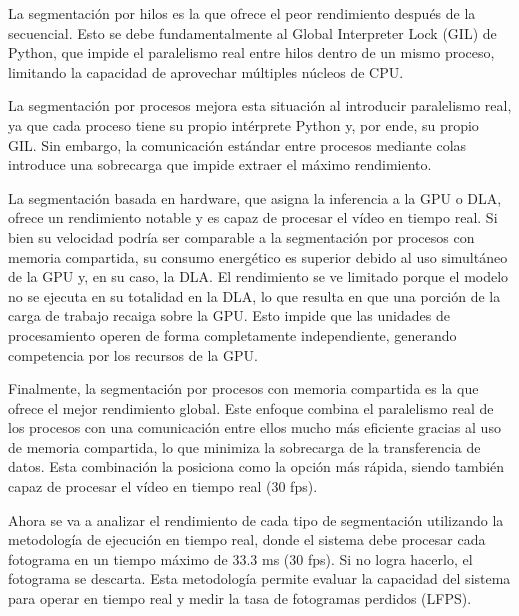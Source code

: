 \documentclass[11pt,spanish,listoffigures,listoftables]{tfgetsinf}
\begin{document}
La segmentación por hilos es la que ofrece el peor rendimiento después de la secuencial. Esto se debe fundamentalmente al Global Interpreter Lock (GIL) de Python, que impide el paralelismo real entre hilos dentro de un mismo proceso, limitando la capacidad de aprovechar múltiples núcleos de CPU.

La segmentación por procesos mejora esta situación al introducir paralelismo real, ya que cada proceso tiene su propio intérprete Python y, por ende, su propio GIL. Sin embargo, la comunicación estándar entre procesos mediante colas introduce una sobrecarga que impide extraer el máximo rendimiento.

La segmentación basada en hardware, que asigna la inferencia a la GPU o DLA, ofrece un rendimiento notable y es capaz de procesar el vídeo en tiempo real. Si bien su velocidad podría ser comparable a la segmentación por procesos con memoria compartida, su consumo energético es superior debido al uso simultáneo de la GPU y, en su caso, la DLA. El rendimiento se ve limitado porque el modelo no se ejecuta en su totalidad en la DLA, lo que resulta en que una porción de la carga de trabajo recaiga sobre la GPU. Esto impide que las unidades de procesamiento operen de forma completamente independiente, generando competencia por los recursos de la GPU.

Finalmente, la segmentación por procesos con memoria compartida es la que ofrece el mejor rendimiento global. Este enfoque combina el paralelismo real de los procesos con una comunicación entre ellos mucho más eficiente gracias al uso de memoria compartida, lo que minimiza la sobrecarga de la transferencia de datos. Esta combinación la posiciona como la opción más rápida, siendo también capaz de procesar el vídeo en tiempo real (30 fps).

Ahora se va a analizar el rendimiento de cada tipo de segmentación utilizando la metodología de ejecución en tiempo real, donde el sistema debe procesar cada fotograma en un tiempo máximo de 33.3 ms (30 fps). Si no logra hacerlo, el fotograma se descarta. Esta metodología permite evaluar la capacidad del sistema para operar en tiempo real y medir la tasa de fotogramas perdidos (LFPS).
\end{document}
